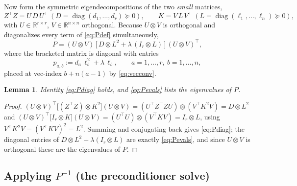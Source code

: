 \documentclass[12pt]{article}
\DeclareMathOperator{\diag}{diag}
\newcommand{\bR}{\mathbb{R}}
\newtheorem{lemma}{Lemma}
\begin{document}
Now form the symmetric eigendecompositions of the two \emph{small}
matrices,
\begin{equation}\label{eq:eig}
  Z^{\top}Z=U\,D\,U^{\top}\ (D=\diag(d_1,\dots,d_r)\succeq0),\qquad
  K=V\,L\,V^{\top}\ (L=\diag(\ell_1,\dots,\ell_n)\succeq0),
\end{equation}
with $U\in\bR^{r\times r}$, $V\in\bR^{n\times n}$ orthogonal. Because
$U\otimes V$ is orthogonal and diagonalizes every term of \eqref{eq:Pdef}
simultaneously,
\begin{equation}\label{eq:Pdiag}
  P=(U\otimes V)\,
  \Big[\,D\otimes L^{2}+\lambda\,(I_r\otimes L)\,\Big]\,
  (U\otimes V)^{\top},
\end{equation}
where the bracketed matrix is diagonal with entries
\begin{equation}\label{eq:Pevals}
  p_{a,b}:=d_a\,\ell_b^{2}+\lambda\,\ell_b,
  \qquad a=1,\dots,r,\ b=1,\dots,n,
\end{equation}
placed at vec-index $b+n(a-1)$ by \eqref{eq:vecconv}.

\begin{lemma}\label{lem:Pdiag}
Identity \eqref{eq:Pdiag} holds, and \eqref{eq:Pevals} lists the
eigenvalues of $P$.
\end{lemma}
\begin{proof}
$(U\otimes V)^{\top}\big[(Z^{\top}Z)\otimes K^2\big](U\otimes V)
=(U^{\top}Z^{\top}ZU)\otimes(V^{\top}K^2V)=D\otimes L^2$ and
$(U\otimes V)^{\top}\big[I_r\otimes K\big](U\otimes V)
=(U^{\top}U)\otimes(V^{\top}KV)=I_r\otimes L$, using
$V^{\top}K^2V=(V^{\top}KV)^2=L^2$. Summing and conjugating back gives
\eqref{eq:Pdiag}; the diagonal entries of $D\otimes L^2+\lambda(I_r\otimes
L)$ are exactly \eqref{eq:Pevals}, and since $U\otimes V$ is orthogonal
these are the eigenvalues of $P$.
\end{proof}

\subsection{Applying $P^{-1}$ (the preconditioner solve)}
\end{document}
